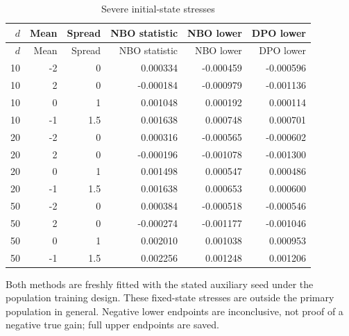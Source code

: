 \begingroup\small\setlength{\tabcolsep}{4pt}
\begin{longtable}{rrrrrr}
\caption{Severe initial-state stresses}\label{tab:r12stress}\\
\toprule
$d$ & Mean & Spread & NBO statistic & NBO lower & DPO lower\\\midrule
\endfirsthead
\toprule
$d$ & Mean & Spread & NBO statistic & NBO lower & DPO lower\\\midrule
\endhead
10 & -2 & 0 & 0.000334 & -0.000459 & -0.000596\\
10 & 2 & 0 & -0.000184 & -0.000979 & -0.001136\\
10 & 0 & 1 & 0.001048 & 0.000192 & 0.000114\\
10 & -1 & 1.5 & 0.001638 & 0.000748 & 0.000701\\
20 & -2 & 0 & 0.000316 & -0.000565 & -0.000602\\
20 & 2 & 0 & -0.000196 & -0.001078 & -0.001300\\
20 & 0 & 1 & 0.001498 & 0.000547 & 0.000486\\
20 & -1 & 1.5 & 0.001638 & 0.000653 & 0.000600\\
50 & -2 & 0 & 0.000384 & -0.000518 & -0.000546\\
50 & 2 & 0 & -0.000274 & -0.001177 & -0.001046\\
50 & 0 & 1 & 0.002010 & 0.001038 & 0.000953\\
50 & -1 & 1.5 & 0.002256 & 0.001248 & 0.001206\\
\bottomrule\end{longtable}
\noindent Both methods are freshly fitted with the stated auxiliary seed under the population training design. These fixed-state stresses are outside the primary population in general. Negative lower endpoints are inconclusive, not proof of a negative true gain; full upper endpoints are saved.
\endgroup
